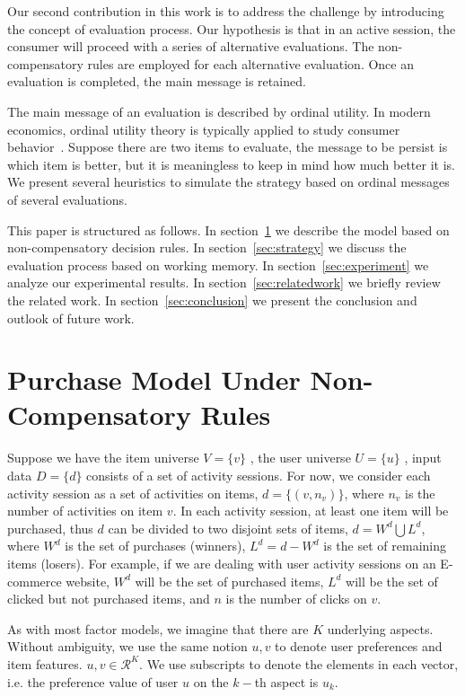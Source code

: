 \documentclass[sigconf]{acmart}
\begin{document}
Our second contribution in this work is to address the challenge by introducing the concept of evaluation  process. Our hypothesis is that in an active session, the consumer will proceed with a series of alternative evaluations. The non-compensatory rules are employed for each alternative evaluation. Once an evaluation is completed, the main message is retained.  

The main message of an evaluation is described by ordinal utility. In modern economics, ordinal utility theory is typically applied to study consumer behavior~\cite{Simon1959Theories}. Suppose there are two items to evaluate, the message to be persist is which item is better, but it is meaningless to keep in mind how much better it is. We present several heuristics to simulate the strategy based on ordinal messages of several evaluations.



This paper is structured as follows. In section~\ref{sec:model} we describe the model based on non-compensatory decision rules. In section~\ref{sec:strategy} we discuss the evaluation process based on working memory. In section~\ref{sec:experiment} we analyze our experimental results. In section~\ref{sec:relatedwork} we briefly review the related work. In section~\ref{sec:conclusion} we present the conclusion and outlook of future work.




\section{Purchase Model Under Non-Compensatory Rules}\label{sec:model}

Suppose we have the item universe $V=\{v\}$ , the user universe $U=\{u\}$ , input data $D=\{d\}$ consists of a set of activity sessions. For now, we consider each activity session as a set of activities on items, $d=\{(v,n_v)\}$, where $n_v$ is the number of activities on item $v$.  In each activity session, at least one item will be purchased, thus $d$ can be divided to two disjoint sets of items, $d=W^d\bigcup L^d$, where $W^d$ is the set of purchases (winners), $L^d=d-W^d$ is the set of remaining items (losers). For example, if we are dealing with user activity sessions on an E-commerce website, $W^d$ will be the set of purchased items, $L^d$ will be the set of clicked but not purchased items, and $n$ is the number of clicks on $v$.


As with most factor models, we imagine that there are $K$ underlying aspects.  Without ambiguity, we use the same notion $u,v$ to denote user preferences and item features. $u,v\in \mathcal{R}^K$. We use subscripts to denote the elements in each vector, i.e. the preference value of user $u$ on the $k-$th aspect is $u_k$. 
\end{document}
